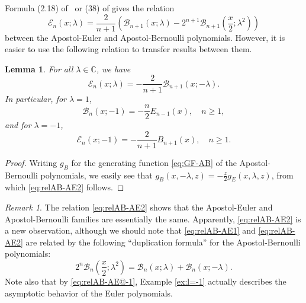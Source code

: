 \documentclass[11pt,a4paper]{amsart}
\newcommand{\C}{\mathbb{C}}
\newcommand{\B}{\mathcal{B}}
\newcommand{\E}{\mathcal{E}}
\theoremstyle{plain}
\newtheorem{lemma}{Lemma}
\theoremstyle{remark}
\newtheorem{remark}{Remark}
\begin{document}
Formula (2.18) of~\cite{Luo-MC} or (38) of \cite{LuoSri} gives the relation
%
\begin{equation}
\label{eq:relAB-AE1}
	\E_{n}(x;\lambda) = \frac{2}{n+1} 
	                    \left(
	                        \B_{n+1}(x;\lambda) 
	                       - 2^{n+1}\B_{n+1}\left(\frac{x}{2};\lambda^{2}\right)
	                    \right)
\end{equation}
%
between the Apostol-Euler and Apostol-Bernoulli polynomials. However, it is easier to use 
the following relation to transfer results between them.


\begin{lemma}
\label{lem:relAB-AE2}
For all $\lambda \in \C$, we have
\begin{equation}
\label{eq:relAB-AE2}
	\E_{n}(x;\lambda) = - \frac{2}{n+1} \B_{n+1}(x;-\lambda).
\end{equation}
In particular, for $\lambda = 1$,
%
\begin{equation}
\label{eq:relAB-AE@-1}
	\B_{n}(x;-1) = - \frac{n}{2} E_{n-1}(x), \quad n \geq 1,
\end{equation}
%
and for $\lambda = -1$,
%
\begin{equation}
\label{eq:relAB-AE@1}
	\E_{n}(x;-1) = - \frac{2}{n+1} B_{n+1}(x), \quad n \geq 1.
\end{equation}
%
\end{lemma}

\begin{proof}
Writing $g_{B}$ for the generating function \eqref{eq:GF-AB} of the Apostol-Bernoulli polynomials, we easily see that $g_{B}(x,-\lambda,z) = -\frac{z}{2}g_{E}(x,\lambda,z)$, from which \eqref{eq:relAB-AE2} follows.
\end{proof}

%
\begin{remark}
The relation \eqref{eq:relAB-AE2} shows that the Apostol-Euler and Apostol-Bernoulli families are essentially the same. Apparently, \eqref{eq:relAB-AE2} is a new observation, although we should note that \eqref{eq:relAB-AE1} and \eqref{eq:relAB-AE2} are related by the following ``duplication formula'' for the Apostol-Bernoulli polynomials:
%
\begin{equation}
\label{eq:AB-mult@2}
	  2^{n} \B_{n}\left(\frac{x}{2}; \lambda^{2}\right)
	= \B_{n}(x;\lambda) + \B_{n}(x;-\lambda).
\end{equation}
%
Note also that by \eqref{eq:relAB-AE@-1}, Example \ref{ex:l=-1} actually describes the asymptotic behavior of the Euler polynomials.
\end{remark}
\end{document}
